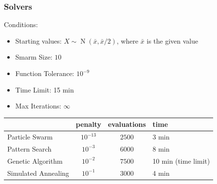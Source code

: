 \documentclass{beamer}
\begin{document}
\begin{frame}
	\frametitle{Solvers}
	Conditions:
	\begin{itemize}
		\item{Starting values: $X\sim \operatorname{N}\left(\bar{x},\bar{x}/2\right)$, where $\bar{x}$ is the given value}
		\item{Smarm Size: $10$}
		\item{Function Tolerance: $10^{-9}$}
		\item{Time Limit: 15 min}
		\item{Max Iterations: $\infty$}
	\end{itemize}
	
	 \vspace{0.5cm}
	
	\begin{tabular}{l|ccl}
		& penalty & evaluations & time \\
		\hline
		Particle Swarm & $10^{-13}$ & $2500$ & 3 min \\
		Pattern Search & $10^{-3}$ & $6000$ & 8 min \\
		Genetic Algorithm & $10^{-2}$ & $7500$ & 10 min (time limit) \\
		Simulated Annealing & $10^{-1}$ & $3000$ & 4 min \\
	\end{tabular}
\end{frame}
\end{document}
